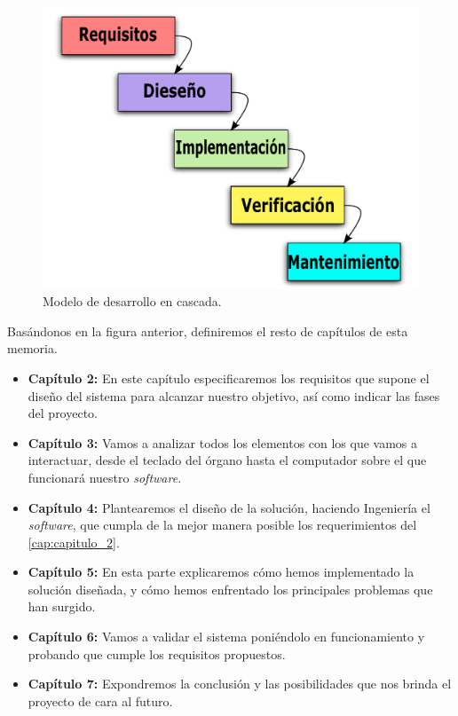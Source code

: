 \begin{figure}[H]
	\noindent \begin{centering}
		\includegraphics[width=\linewidth/2]{capitulo1/figura12}
		\par\end{centering}
	\smallskip
	\caption[Modelo de desarrollo en cascada.]{\label{fig:figura12} Modelo de desarrollo en cascada. \cite{wiki_cascada}}
\end{figure} 

\smallskip

Basándonos en la figura anterior, definiremos el resto de capítulos de esta memoria.

\begin{itemize}

\item \textbf{Capítulo 2:} En este capítulo especificaremos los requisitos que supone el diseño del sistema para alcanzar nuestro objetivo, así como indicar las fases del proyecto.

\item \textbf{Capítulo 3:} Vamos a analizar todos los elementos con los que vamos a interactuar, desde el teclado del órgano hasta el computador sobre el que funcionará nuestro \textit{software}. 

\item \textbf{Capítulo 4:} Plantearemos el diseño de la solución, haciendo Ingeniería el \textit{software}, que cumpla de la mejor manera posible los requerimientos del \ref{cap:capitulo_2}.

\item \textbf{Capítulo 5:} En esta parte explicaremos cómo hemos implementado la solución diseñada, y cómo hemos enfrentado los principales problemas que han surgido.

\item \textbf{Capítulo 6:} Vamos a validar el sistema poniéndolo en funcionamiento y probando que cumple los requisitos propuestos.

\item \textbf{Capítulo 7:} Expondremos la conclusión y las posibilidades que nos brinda el proyecto de cara al futuro.
  
\end{itemize}

\newpage
\clearpage{\pagestyle{empty}\cleardoublepage}
